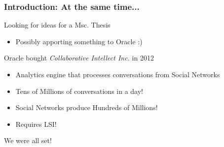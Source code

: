 	\begin{frame}[plain]
	 	\frametitle{Introduction: At the same time...}
		\begin{block}{}
      Looking for ideas for a Msc. Thesis
      \begin{itemize}
        \item Possibly apporting something to Oracle :)
      \end{itemize}
		\end{block} 
		\begin{block}{}
      Oracle bought \textit{Collaborative Intellect Inc.} in 2012
\cite{oracle00, oracle01}
      \begin{itemize}
        \item Analytics engine that processes conversations from Social Networks
        \item Tens of Millions of conversations in a day!
        \item Social Networks produce Hundreds of Millions!
        \item Requires LSI!
      \end{itemize}
		\end{block} 
    \begin{block}{}
    We were all set!
    \end{block}
	\end{frame}
